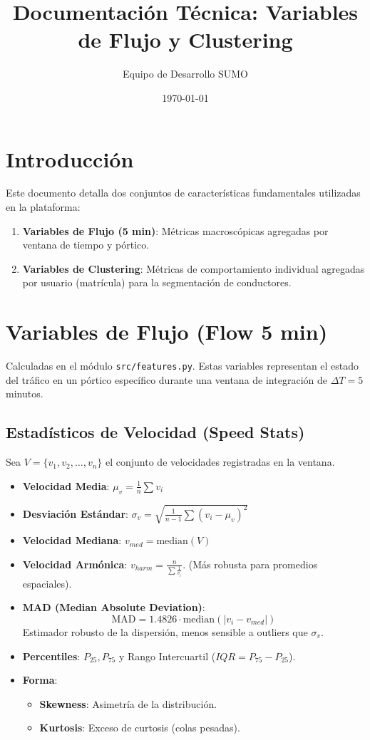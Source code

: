 \documentclass{article}
\title{Documentación Técnica: Variables de Flujo y Clustering}
\author{Equipo de Desarrollo SUMO}
\date{\today}
\begin{document}
\maketitle

\section{Introducción}
Este documento detalla dos conjuntos de características fundamentales utilizadas en la plataforma:
\begin{enumerate}
    \item \textbf{Variables de Flujo (5 min)}: Métricas macroscópicas agregadas por ventana de tiempo y pórtico.
    \item \textbf{Variables de Clustering}: Métricas de comportamiento individual agregadas por usuario (matrícula) para la segmentación de conductores.
\end{enumerate}

\section{Variables de Flujo (Flow 5 min)}
Calculadas en el módulo \texttt{src/features.py}. Estas variables representan el estado del tráfico en un pórtico específico durante una ventana de integración de $\Delta T = 5$ minutos.

\subsection{Estadísticos de Velocidad (Speed Stats)}
Sea $V = \{v_1, v_2, \dots, v_n\}$ el conjunto de velocidades registradas en la ventana.

\begin{itemize}
    \item \textbf{Velocidad Media}: $\mu_v = \frac{1}{n}\sum v_i$
    \item \textbf{Desviación Estándar}: $\sigma_v = \sqrt{\frac{1}{n-1}\sum (v_i - \mu_v)^2}$
    \item \textbf{Velocidad Mediana}: $v_{med} = \text{median}(V)$
    \item \textbf{Velocidad Armónica}: $v_{harm} = \frac{n}{\sum \frac{1}{v_i}}$. (Más robusta para promedios espaciales).
    \item \textbf{MAD (Median Absolute Deviation)}:
    \[ \text{MAD} = 1.4826 \cdot \text{median}(|v_i - v_{med}|) \]
    Estimador robusto de la dispersión, menos sensible a outliers que $\sigma_v$.
    \item \textbf{Percentiles}: $P_{25}, P_{75}$ y Rango Intercuartil ($IQR = P_{75} - P_{25}$).
    \item \textbf{Forma}:
        \begin{itemize}
            \item \textbf{Skewness}: Asimetría de la distribución.
            \item \textbf{Kurtosis}: Exceso de curtosis (colas pesadas).
        \end{itemize}
\end{itemize}
\end{document}
